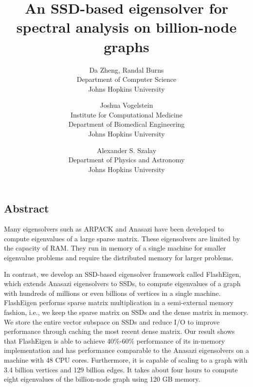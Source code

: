 \documentclass[letterpaper,twocolumn,10pt]{article}
\begin{document}
\date{}

\title{An SSD-based eigensolver for spectral analysis on billion-node graphs}

\author{
{\rm Da Zheng, Randal Burns}\\
Department of Computer Science \\
Johns Hopkins University
\and
{\rm Joshua Vogelstein}\\
Institute for Computational Medicine \\
Department of Biomedical Engineering \\
Johns Hopkins University
\and
{\rm Alexander S. Szalay}\\
Department of Physics and Astronomy \\
Johns Hopkins University
} %

\maketitle

\thispagestyle{empty}


\subsection*{Abstract}
Many eigensolvers such as ARPACK and Anasazi have been developed to compute
eigenvalues of a large sparse matrix. These eigensolvers are limited by
the capacity of RAM. They run in memory of a single machine for smaller
eigenvalue problems and require the distributed memory for larger problems.

In contrast, we develop an SSD-based eigensolver framework called FlashEigen,
which extends Anasazi eigensolvers to SSDs, to compute eigenvalues of a graph
with hundreds of millions or even billions of vertices in a single machine.
FlashEigen performs sparse matrix multiplication in a semi-external memory
fashion, i.e., we keep the sparse matrix on SSDs and the dense matrix in memory.
We store the entire vector subspace on SSDs and reduce I/O to improve
performance through caching the most recent dense matrix.
Our result shows that FlashEigen is able to achieve 40\%-60\% performance
of its in-memory implementation and has performance comparable to the Anasazi
eigensolvers on a machine with 48 CPU cores. Furthermore, it is capable of
scaling to a graph with 3.4 billion vertices and 129 billion edges. It takes
about four hours to compute eight eigenvalues of the billion-node graph using
120 GB memory.
\end{document}
